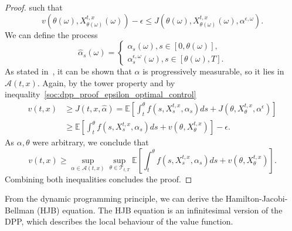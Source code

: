\begin{proof}
    such that
\begin{equation}\label{soc:dpp_proof_epsilon_optimal_control}
    v(\theta(\omega), X^{t,x}_{\theta(\omega)}(\omega)) - \epsilon \leq J(\theta(\omega), X^{t,x}_{\theta(\omega)}(\omega), \alpha^{\epsilon, \omega}).
\end{equation}    
    We can define the process
\begin{equation*}
    \hat\alpha_s(\omega) = 
    \begin{cases}
        \alpha_s(\omega), s \in [0,\theta(\omega)],\\
        \alpha_s^{\epsilon, \omega}(\omega), s \in [\theta(\omega), T].
    \end{cases}
\end{equation*}
As stated in~\cite{Pham}, it can be shown that $\hat \alpha$ is progressively measurable,
so it lies in $\mathcal{A}(t,x)$.
Again, by the tower property and by inequality~\eqref{soc:dpp_proof_epsilon_optimal_control}
\begin{align*}
    v(t,x) &\geq J(t,x, \hat \alpha) = \mathbb{E}\left[ \int_t^\theta f(s,X^{t,x}_s, \alpha_s) ds + J(\theta, X^{t,x}_\theta, \alpha^\epsilon) \right] \\
            &\geq \mathbb{E}\left[ \int_t^\theta f(s,X^{t,x}_s, \alpha_s) ds + v(\theta, X^{t,x}_\theta) \right] - \epsilon.
\end{align*}
As $\alpha, \theta$ were arbitrary, we conclude that
\begin{equation}
    v(t,x) \geq \sup_{\alpha \in \mathcal{A}(t,x)} \sup_{\theta \in \mathcal{T}_{t,T}} \mathbb{E} \left[ \int_t^\theta f(s, X_s^{t,x}, \alpha_s) ds + v(\theta, X^{t,x}_\theta) \right].
\end{equation}
Combining both inequalities concludes the proof.
\end{proof}

From the dynamic programming principle, we can derive the Hamilton-Jacobi-Bellman (HJB)
equation. The HJB equation is an infinitesimal version of the DPP, which describes
the local behaviour of the value function.

